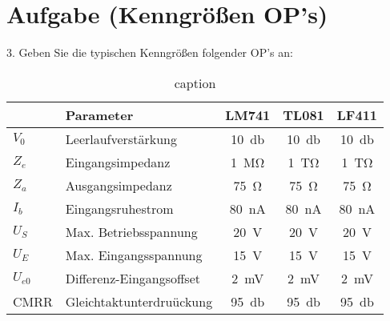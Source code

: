 \section{Aufgabe (Kenngrößen OP's)}%
\label{sec:aufgabe_3}

3. Geben Sie die typischen Kenngrößen folgender OP's an:

\begin{table}[h]
    \centering
    \caption{caption}
    \label{tab:label}
    \begin{tabular}{l l c c c}
        \toprule
        & Parameter & LM741 & TL081 & LF411 \\
        \midrule 
        $V_0$   & Leerlaufverstärkung   & \SI{10}{\decibel} & \SI{10}{\decibel} & \SI{10}{\decibel} \\
        $Z_e$   & Eingangsimpedanz      & \SI{1}{\mega\ohm} & \SI{1}{\tera\ohm} & \SI{1}{\tera\ohm} \\
        $Z_a$   & Ausgangsimpedanz      & \SI{75}{\ohm} & \SI{75}{\ohm} & \SI{75}{\ohm} \\
        $I_b$   & Eingangsruhestrom     & \SI{80}{\nano\ampere} &
        \SI{80}{\nano\ampere} & \SI{80}{\nano\ampere} \\
        $U_S$   & Max. Betriebsspannung & \SI{20}{\volt} & \SI{20}{\volt} & \SI{20}{\volt} \\
        $U_E$   & Max. Eingangsspannung & \SI{15}{\volt} & \SI{15}{\volt} & \SI{15}{\volt} \\
        $U_{e0}$& Differenz-Eingangsoffset & \SI{2}{\milli\volt} &
        \SI{2}{\milli\volt} & \SI{2}{\milli\volt} \\
        CMRR    & Gleichtaktunterdruückung & \SI{95}{\decibel} &
        \SI{95}{\decibel} & \SI{95}{\decibel}      \\
        \bottomrule
    \end{tabular}
\end{table}

